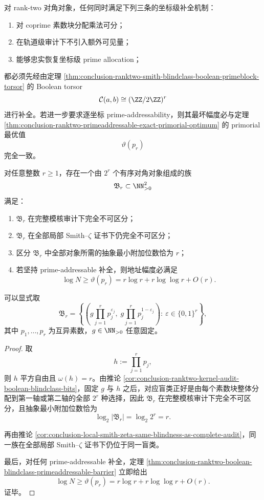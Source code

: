 \begin{conjecture}\label{conj:conclusion-ranktwo-boolean-torsor-universal-minimal-completion-obstruction}
对 rank-two 对角对象，任何同时满足下列三条的坐标级补全机制：
\begin{enumerate}
  \item 对 coprime 素数块分配乘法可分；
  \item 在轨道级审计下不引入额外可见量；
  \item 能够忠实恢复坐标级 prime allocation；
\end{enumerate}
都必须先经由定理 \ref{thm:conclusion-ranktwo-smith-blindclass-boolean-primeblock-torsor} 的 Boolean torsor
\[
\mathcal C(a,b)\cong (\ZZ/2\ZZ)^r
\]
进行补全。若进一步要求逐坐标 prime-addressability，则其最坏幅度必与定理 \ref{thm:conclusion-ranktwo-primeaddressable-exact-primorial-optimum} 的 primorial 最优值
\[
\vartheta(p_r)
\]
完全一致。
\end{conjecture}

\begin{corollary}\label{cor:conclusion-arbitrary-dimensional-boolean-audit-blind-cavity}
对任意整数 \(r\ge 1\)，存在一个由 \(2^r\) 个有序对角对象组成的族
\[
\mathfrak B_r\subset \NN_{>0}^2
\]
满足：
\begin{enumerate}
  \item \(\mathfrak B_r\) 在完整模核审计下完全不可区分；
  \item \(\mathfrak B_r\) 在全部局部 Smith--\(\zeta\) 证书下仍完全不可区分；
  \item 区分 \(\mathfrak B_r\) 中全部对象所需的抽象最小附加位数恰为 \(r\)；
  \item 若坚持 prime-addressable 补全，则地址幅度必满足
  \[
  \log N\ge \vartheta(p_r)=r\log r+r\log\log r+O(r).
  \]
\end{enumerate}
可以显式取
\[
\mathfrak B_r=
\left\{
\left(
g\prod_{j=1}^{r}p_j^{\varepsilon_j},
\;
g\prod_{j=1}^{r}p_j^{1-\varepsilon_j}
\right):
\ \varepsilon\in\{0,1\}^r
\right\},
\]
其中 \(p_1,\dots,p_r\) 为互异素数，\(g\in\NN_{>0}\) 任意固定。
\end{corollary}
\begin{proof}
取
\[
h:=\prod_{j=1}^{r}p_j,
\]
则 \(h\) 平方自由且 \(\omega(h)=r\)。由推论 \ref{cor:conclusion-ranktwo-kernel-audit-boolean-blindclass-bits}，固定 \(g\) 与 \(h\) 之后，对应盲类正好是由每个素数块整体分配到第一轴或第二轴的全部 \(2^r\) 种选择，因此 \(\mathfrak B_r\) 在完整模核审计下完全不可区分，且抽象最小附加位数恰为
\[
\log_2 |\mathfrak B_r|=\log_2 2^r=r.
\]

再由推论 \ref{cor:conclusion-local-smith-zeta-same-blindness-as-complete-audit}，同一族在全部局部 Smith--\(\zeta\) 证书下仍位于同一盲类。

最后，对任何 prime-addressable 补全，定理 \ref{thm:conclusion-ranktwo-boolean-blindclass-primeaddressable-barrier} 立即给出
\[
\log N\ge \vartheta(p_r)=r\log r+r\log\log r+O(r).
\]
证毕。
\end{proof}
